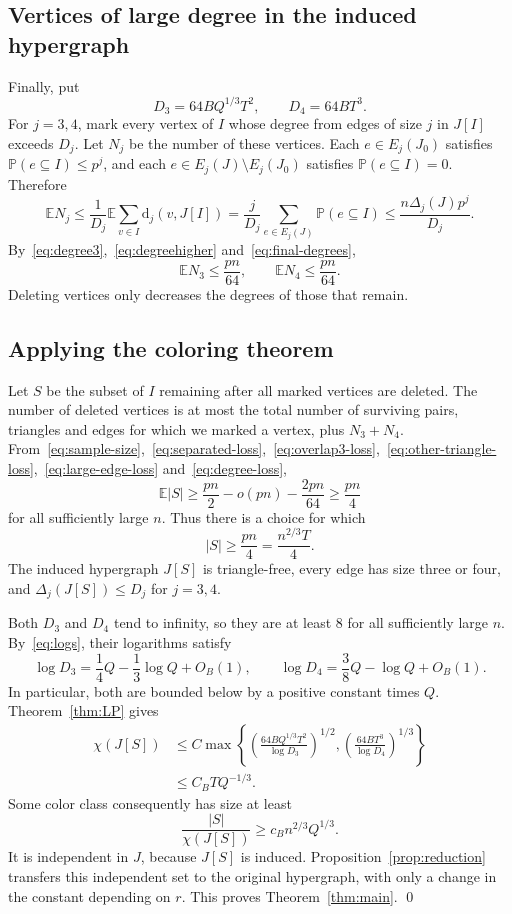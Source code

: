 \documentclass[11pt]{article}
\numberwithin{equation}{section}
\theoremstyle{remark}
\newcommand{\E}{\mathbb E}
\newcommand{\Pp}{\mathbb P}
\newcommand{\dd}{\mathrm d}
\begin{document}
\subsection{Vertices of large degree in the induced hypergraph}
Finally, put
\begin{equation}\label{eq:final-degrees}
 D_3=64BQ^{1/3}T^2,
 \qquad D_4=64BT^3.
\end{equation}
For $j=3,4$, mark every vertex of $I$ whose degree from edges of size $j$ in $J[I]$ exceeds $D_j$. Let $N_j$ be the number of these vertices. Each $e\in E_j(J_0)$ satisfies $\Pp(e\subseteq I)\le p^j$, and each $e\in E_j(J)\setminus E_j(J_0)$ satisfies $\Pp(e\subseteq I)=0$. Therefore
\[
 \E N_j
 \le\frac1{D_j}\E\sum_{v\in I}\dd_j(v,J[I])
 =\frac{j}{D_j}\sum_{e\in E_j(J)}\Pp(e\subseteq I)
 \le\frac{n\Delta_j(J)p^j}{D_j}.
\]
By~\eqref{eq:degree3},~\eqref{eq:degreehigher} and~\eqref{eq:final-degrees},
\begin{equation}\label{eq:degree-loss}
 \E N_3\le\frac{pn}{64},\qquad
 \E N_4\le\frac{pn}{64}.
\end{equation}
Deleting vertices only decreases the degrees of those that remain.

\subsection{Applying the coloring theorem}
Let $S$ be the subset of $I$ remaining after all marked vertices are deleted. The number of deleted vertices is at most the total number of surviving pairs, triangles and edges for which we marked a vertex, plus $N_3+N_4$. From~\eqref{eq:sample-size},~\eqref{eq:separated-loss},~\eqref{eq:overlap3-loss},~\eqref{eq:other-triangle-loss},~\eqref{eq:large-edge-loss} and~\eqref{eq:degree-loss},
\[
 \E|S|\ge\frac{pn}{2}-o(pn)-\frac{2pn}{64}\ge\frac{pn}{4}
\]
for all sufficiently large $n$. Thus there is a choice for which
\begin{equation}\label{eq:retained-size}
 |S|\ge\frac{pn}{4}=\frac{n^{2/3}T}{4}.
\end{equation}
The induced hypergraph $J[S]$ is triangle-free, every edge has size three or four, and $\Delta_j(J[S])\le D_j$ for $j=3,4$.

Both $D_3$ and $D_4$ tend to infinity, so they are at least $8$ for all sufficiently large $n$. By~\eqref{eq:logs}, their logarithms satisfy
\[
 \log D_3=\frac14Q-\frac13\log Q+O_B(1),
 \qquad
 \log D_4=\frac38Q-\log Q+O_B(1).
\]
In particular, both are bounded below by a positive constant times $Q$. Theorem~\ref{thm:LP} gives
\begin{align*}
 \chi(J[S])
 &\le C\max\left\{
 \left(\frac{64BQ^{1/3}T^2}{\log D_3}\right)^{1/2},
 \left(\frac{64BT^3}{\log D_4}\right)^{1/3}
 \right\}\\
 &\le C_B TQ^{-1/3}.
\end{align*}
Some color class consequently has size at least
\[
 \frac{|S|}{\chi(J[S])}\ge c_B n^{2/3}Q^{1/3}.
\]
It is independent in $J$, because $J[S]$ is induced. Proposition~\ref{prop:reduction} transfers this independent set to the original hypergraph, with only a change in the constant depending on $r$. This proves Theorem~\ref{thm:main}.
\qed
\end{document}
